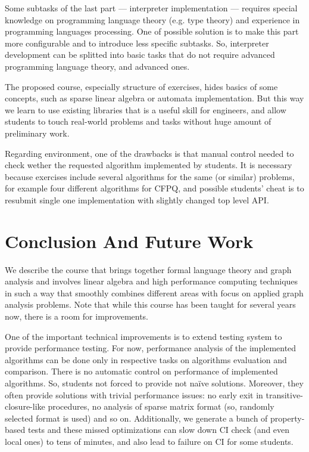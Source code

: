 \documentclass[sigconf]{acmart}
\begin{document}
Some subtasks of the last part --- interpreter implementation --- requires special knowledge on programming language theory (e.g. type theory) and experience in programming languages processing.
One of possible solution is to make this part more configurable and to introduce less specific subtasks.
So, interpreter development can be splitted into basic tasks that do not require advanced programming language theory, and advanced ones.


The proposed course, especially structure of exercises, hides basics of some concepts, such as sparse linear algebra or automata implementation.
But this way we learn to use existing libraries that is a useful skill for engineers, and allow students to touch real-world problems and tasks without huge amount of preliminary work.

Regarding environment, one of the drawbacks is that manual control needed to check wether the requested algorithm implemented by students.
It is necessary because exercises include several algorithms for the same (or similar) problems, for example four different algorithms for CFPQ, and possible students' cheat is to resubmit single one implementation with slightly changed top level API.


\section{Conclusion And Future Work}

We describe the course that brings together formal language theory and graph analysis and involves linear algebra and high performance computing techniques in such a way that smoothly combines different areas with focus on applied graph analysis problems. 
Note that while this course has been taught for several years now, there is a room for improvements.

One of the important technical improvements is to extend testing system to provide performance testing. 
For now, performance analysis of the implemented algorithms can be done only in respective tasks on algorithms evaluation and comparison.
There is no automatic control on performance of implemented algorithms. 
So, students not forced to provide not na\"ive solutions.
Moreover, they often provide solutions with trivial performance issues: no early exit in transitive-closure-like procedures, no analysis of sparse matrix format (so, randomly selected format is used) and so on.
Additionally, we generate a bunch of property-based tests and these missed optimizations can slow down CI check (and even local ones) to tens of minutes, and also lead to failure on CI for some students.
\end{document}
